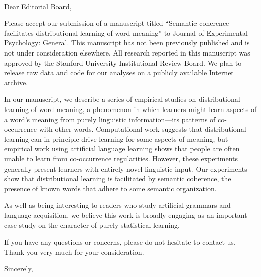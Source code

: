 \documentclass{letter}
\begin{document}
\address{450 Serra Mall \\ Building 420 (Jordan Hall) \\ Stanford, CA~~94305}
\signature{Long Ouyang, Lera Boroditsky,\\and Michael C. Frank}

\pagestyle{empty}
\begin{letter}{~~~}
\opening{Dear Editorial Board,}

Please accept our submission of a manuscript titled ``Semantic coherence facilitates distributional learning of word meaning'' to Journal of Experimental Psychology: General. This manuscript has not been previously published and is not under consideration elsewhere. All research reported in this manuscript was approved by the Stanford University Institutional Review Board. We plan to release raw data and code for our analyses on a publicly available Internet archive.

In our manuscript, we describe a series of empirical studies on distributional learning of word meaning, a phenomenon in which learners might learn aspects of a word's meaning from purely linguistic information---its patterns of co-occurrence with other words. Computational work suggests that distributional learning can in principle drive learning for some aspects of meaning, but empirical work using artificial language learning shows that people are often unable to learn from co-occurrence regularities. However, these experiments generally present learners with entirely novel linguistic input. Our experiments show that distributional learning is facilitated by semantic coherence, the presence of known words that adhere to some semantic organization.

As well as being interesting to readers who study artificial grammars and language acquisition, we believe this work is broadly engaging as an important case study on the character of purely statistical learning.

If you have any questions or concerns, please do not hesitate to contact us. Thank you very much for your consideration.

\vspace{3\parskip}
\closing{Sincerely,}

\end{letter}
\end{document}
